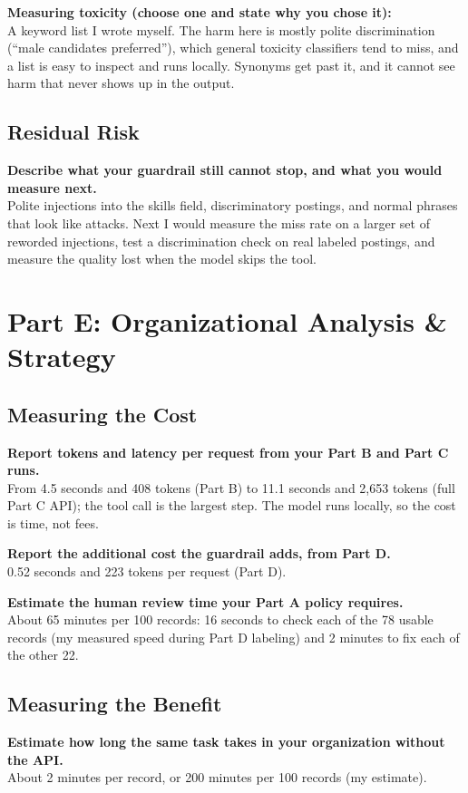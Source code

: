 \documentclass[11pt]{article}
\newcommand{\q}[1]{\par\noindent\textbf{#1}\\}
\begin{document}
\q{Measuring toxicity (choose one and state why you chose it):}
A keyword list I wrote myself. The harm here is mostly polite discrimination (``male candidates preferred''), which general toxicity classifiers tend to miss, and a list is easy to inspect and runs locally. Synonyms get past it, and it cannot see harm that never shows up in the output.

\subsection{Residual Risk}

\q{Describe what your guardrail still cannot stop, and what you would measure next.}
Polite injections into the skills field, discriminatory postings, and normal phrases that look like attacks. Next I would measure the miss rate on a larger set of reworded injections, test a discrimination check on real labeled postings, and measure the quality lost when the model skips the tool.

\section{Part E: Organizational Analysis \& Strategy}

\subsection{Measuring the Cost}

\q{Report tokens and latency per request from your Part B and Part C runs.}
From 4.5 seconds and 408 tokens (Part B) to 11.1 seconds and 2,653 tokens (full Part C API); the tool call is the largest step. The model runs locally, so the cost is time, not fees.

\q{Report the additional cost the guardrail adds, from Part D.}
0.52 seconds and 223 tokens per request (Part D).

\q{Estimate the human review time your Part A policy requires.}
About 65 minutes per 100 records: 16 seconds to check each of the 78 usable records (my measured speed during Part D labeling) and 2 minutes to fix each of the other 22.

\subsection{Measuring the Benefit}

\q{Estimate how long the same task takes in your organization without the API.}
About 2 minutes per record, or 200 minutes per 100 records (my estimate).
\end{document}
